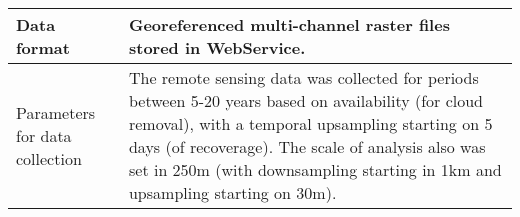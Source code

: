 \documentclass[times,final]{elsarticle.cls}
\begin{document}
{\begin{longtable}{|p{33mm}|p{94mm}|}
\hline                         
Data format            & Georeferenced multi-channel raster files stored in WebService.\\
\hline                         
Parameters for         
data\newline 
collection             & The remote sensing data was collected for periods between                          5-20 years based on availability (for cloud removal), with a                         temporal upsampling starting on 5 days (of recoverage). The                           scale of analysis also was set in 250m (with downsampling                           starting in 1km and upsampling starting on 30m). \\  


\end{longtable}}
\end{document}
